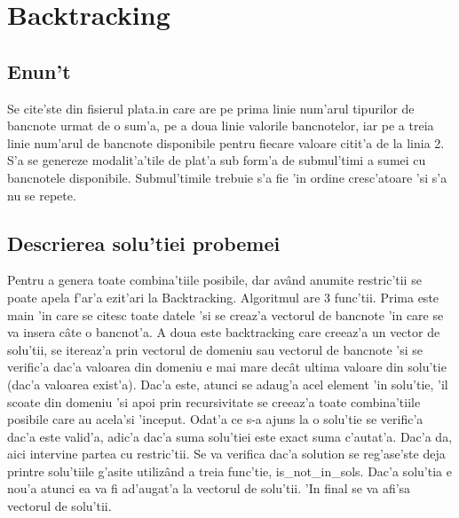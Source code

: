 \chapter{Backtracking}
\section{Enun't}
\myindent
Se cite'ste din fisierul plata.in care are pe prima linie num'arul tipurilor de bancnote urmat de o sum'a, pe a doua linie valorile bancnotelor, iar pe a treia linie num'arul de bancnote disponibile pentru fiecare valoare citit'a de la linia 2. S'a se genereze modalit'a'tile de plat'a sub form'a de submul'timi a sumei cu bancnotele disponibile. Submul'timile trebuie s'a fie 'in ordine cresc'atoare 'si s'a nu se repete.

\vspace{10mm}
\section{Descrierea solu'tiei probemei}
\myindent
Pentru a genera toate combina'tiile posibile, dar av\^and anumite restric'tii se poate apela f'ar'a ezit'ari la Backtracking. Algoritmul are 3 func'tii. Prima este main 'in care se citesc toate datele 'si se creaz'a vectorul de bancnote 'in care se va insera c\^ate o bancnot'a. A doua este backtracking care creeaz'a un vector de solu'tii, se itereaz'a prin vectorul de domeniu sau vectorul de bancnote 'si se verific'a dac'a valoarea din domeniu e mai mare dec\^at ultima valoare din solu'tie (dac'a valoarea exist'a). Dac'a este, atunci se adaug'a acel element 'in solu'tie, 'il scoate din domeniu 'si apoi prin recursivitate se creeaz'a toate combina'tiile posibile care au acela'si 'inceput. Odat'a ce s-a ajuns la o solu'tie se verific'a dac'a este valid'a, adic'a dac'a suma solu'tiei este exact suma c'autat'a. Dac'a da, aici intervine partea cu restric'tii. Se va verifica dac'a solution se reg'ase'ste deja printre solu'tiile g'asite utiliz\^and a treia func'tie, is\_not\_in\_sols. Dac'a solu'tia e nou'a atunci ea va fi ad'augat'a la vectorul de solu'tii. 'In final se va afi'sa vectorul de solu'tii.


